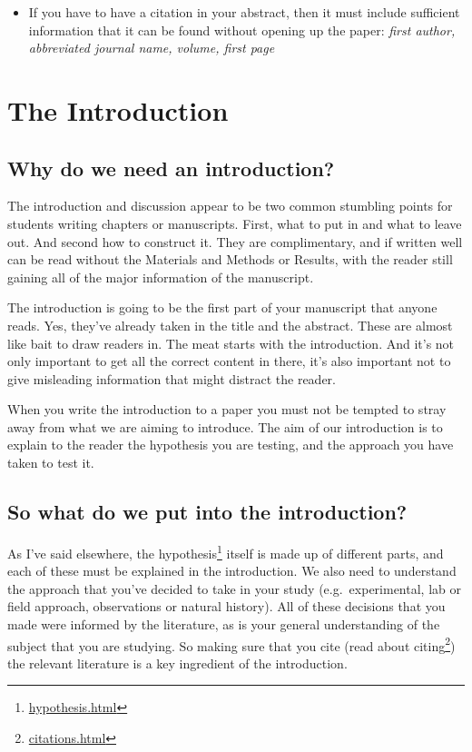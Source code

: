 \documentclass[
]{krantz}
\providecommand{\tightlist}{%
  \setlength{\itemsep}{0pt}\setlength{\parskip}{0pt}}
\renewcommand{\href}[2]{#2\footnote{\url{#1}}}
\begin{document}
\begin{itemize}
  \begin{itemize}
  \tightlist
  \item
    If you have to have a citation in your abstract, then it must include sufficient information that it can be found without opening up the paper: \emph{first author, abbreviated journal name, volume, first page}
  \end{itemize}
\end{itemize}

\hypertarget{introduction}{%
\section{The Introduction}\label{introduction}}

\hypertarget{why-do-we-need-an-introduction}{%
\subsection{Why do we need an introduction?}\label{why-do-we-need-an-introduction}}

The introduction and discussion appear to be two common stumbling points for students writing chapters or manuscripts. First, what to put in and what to leave out. And second how to construct it. They are complimentary, and if written well can be read without the Materials and Methods or Results, with the reader still gaining all of the major information of the manuscript.

The introduction is going to be the first part of your manuscript that anyone reads. Yes, they've already taken in the title and the abstract. These are almost like bait to draw readers in. The meat starts with the introduction. And it's not only important to get all the correct content in there, it's also important not to give misleading information that might distract the reader.

When you write the introduction to a paper you must not be tempted to stray away from what we are aiming to introduce. The aim of our introduction is to explain to the reader the hypothesis you are testing, and the approach you have taken to test it.

\hypertarget{so-what-do-we-put-into-the-introduction}{%
\subsection{So what do we put into the introduction?}\label{so-what-do-we-put-into-the-introduction}}

As I've said elsewhere, the \href{hypothesis.html}{hypothesis} itself is made up of different parts, and each of these must be explained in the introduction. We also need to understand the approach that you've decided to take in your study (e.g.~experimental, lab or field approach, observations or natural history). All of these decisions that you made were informed by the literature, as is your general understanding of the subject that you are studying. So making sure that you cite (\href{citations.html}{read about citing}) the relevant literature is a key ingredient of the introduction.
\end{document}
